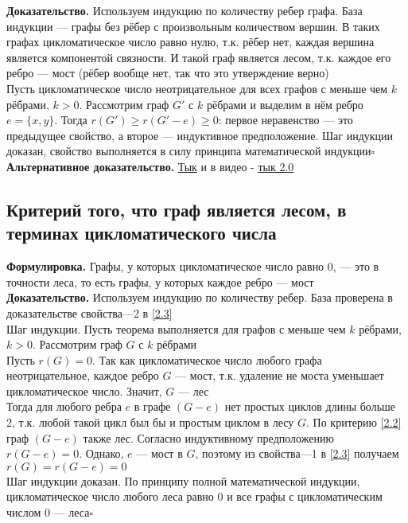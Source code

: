 \documentclass[a4paper]{article}
\begin{document}
\indent\textbf{Доказательство.} Используем индукцию по количеству ребер графа. База индукции — графы без рёбер с произвольным количеством вершин. В таких графах цикломатическое число равно нулю, т.к. рёбер нет, каждая вершина является компонентой связности. И такой граф является лесом, т.к. каждое его ребро — мост (рёбер вообще нет, так что это утверждение верно)\\[2mm]
\indent Пусть цикломатическое число неотрицательное для всех графов с меньше чем $k$ рёбрами, $k > 0$. Рассмотрим граф $G'$ с $k$ рёбрами и выделим в нём ребро $e = \{x, y\}$.
Тогда $r(G') \geqslant r(G'-e) \geqslant 0$: первое неравенство — это предыдущее свойство, а второе — индуктивное предположение. Шаг индукции доказан, свойство выполняется в силу принципа математической индукции\hfill$\square$\\[2mm]
\indent \textbf{Альтернативное доказательство.} \href{https://studfile.net/preview/300139/page:2/}{Тык} и в видео - \href{https://youtu.be/1k7wX_YhigE?si=0m5CQdBiml5Wa97j&t=3465}{тык 2.0}


\subsection{Критерий того, что граф является лесом, в терминах цикломатического числа}\label{2.4}
\textbf{Формулировка.} Графы, у которых цикломатическое число равно 0, — это в точности леса, то есть графы, у которых каждое ребро — мост\\[2mm]
\indent\textbf{Доказательство.} Используем индукцию по количеству ребер. База проверена в доказательстве свойства—2 в \ref{2.3}\\[2mm]
\indent Шаг индукции. Пусть теорема выполняется для графов с меньше чем $k$ рёбрами,
$k > 0$. Рассмотрим граф $G$ с $k$ рёбрами\\[2mm]
\indent Пусть $r(G)=0$. Так как цикломатическое число любого графа неотрицательное, каждое ребро $G$ — мост, т.к. удаление не моста уменьшает цикломатическое число. Значит, $G$ — лес\\[2mm]
\indent Тогда для любого ребра $e$ в графе $(G-e)$ нет простых циклов длины больше 2, т.к. любой такой цикл был бы и простым циклом в лесу $G$. По критерию \ref{2.2} граф $(G-e)$ также лес. Согласно индуктивному предположению $r(G-e)=0$. Однако, $e$ — мост в $G$, поэтому из свойства—1 в \ref{2.3} получаем $r(G)=r(G-e)=0$\\[2mm]
\indent Шаг индукции доказан. По принципу полной математической индукции, цикломатическое число любого леса равно 0 и все графы с цикломатическим числом 0 — леса\hfill$\square$
\end{document}
